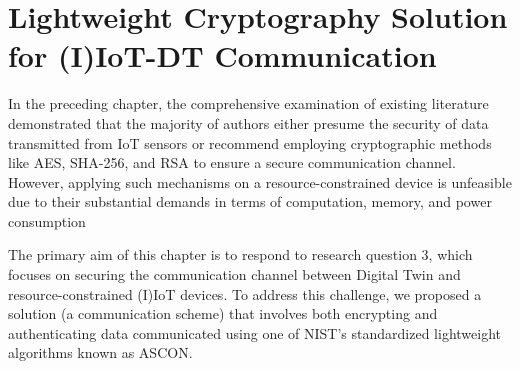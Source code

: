 


\chapter{Lightweight Cryptography Solution for (I)IoT-DT Communication}
\label{Chapter3} %



In the preceding chapter, the comprehensive examination of existing literature demonstrated that the majority of authors either presume the security of data transmitted from IoT sensors or recommend employing cryptographic methods like AES, SHA-256, and RSA to ensure a secure communication channel. However, applying such mechanisms on a resource-constrained device is unfeasible due to their substantial demands in terms of computation, memory, and power consumption \cite{vanderwalSecuringNetworksIoT2022a}





The primary aim of this chapter is to respond to research question 3, which focuses on securing the communication channel between Digital Twin and resource-constrained (I)IoT devices. To address this challenge, we proposed a solution (a communication scheme) that involves both encrypting and authenticating data communicated using one of NIST's standardized lightweight algorithms known as ASCON.  

